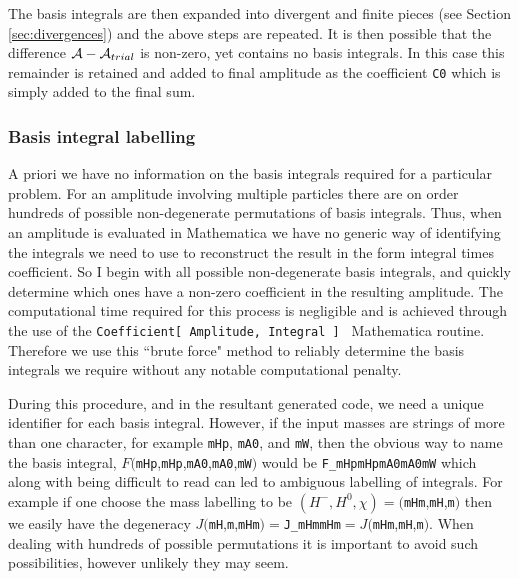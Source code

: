 The basis integrals are then expanded into divergent and finite pieces (see Section \ref{sec:divergences}) and the above steps are repeated.  It is then possible that the difference $\mathcal{A} - \mathcal{A}_{trial}$ is non-zero, yet contains no basis integrals.  In this case this remainder is retained and added to final amplitude as the coefficient \lstinline{C0} which is simply added to the final sum.

\subsubsection{Basis integral labelling}

A priori we have no information on the basis integrals required for a particular problem.  For an amplitude involving multiple particles there are on order hundreds of possible non-degenerate permutations of basis integrals.  Thus, when an amplitude is evaluated in Mathematica we have no generic way of identifying the integrals we need to use to reconstruct the result in the form integral times coefficient.  So I begin with all possible non-degenerate basis integrals, and quickly determine which ones have a non-zero coefficient in the resulting amplitude.  The computational time required for this process is negligible and is achieved through the use of the \lstinline{Coefficient[ Amplitude, Integral ] } Mathematica routine.  Therefore we use this ``brute force" method to reliably determine the basis integrals we require without any notable computational penalty.

During this procedure, and in the resultant generated \CC code, we need a unique identifier for each basis integral.  However, if the input masses are strings of more than one character, for example \lstinline{mHp}, \lstinline{mA0}, and \lstinline{mW}, then the obvious way to name the basis integral, $F($\lstinline{mHp},\lstinline{mHp},\lstinline{mA0},\lstinline{mA0},\lstinline{mW}$)$ would be \lstinline{F_mHpmHpmA0mA0mW} which along with being difficult to read can led to ambiguous labelling of integrals.  For example if one choose the mass labelling to be $(H^-, H^0, \chi ) = ($\lstinline{mHm},\lstinline{mH},\lstinline{m}$)$ then we easily have the degeneracy $J($\lstinline{mH},\lstinline{m},\lstinline{mHm}$) =  $\lstinline{J_mHmmHm}$ = J($\lstinline{mHm},\lstinline{mH},\lstinline{m}$)$.  When dealing with hundreds of possible permutations it is important to avoid such possibilities, however unlikely they may seem.

